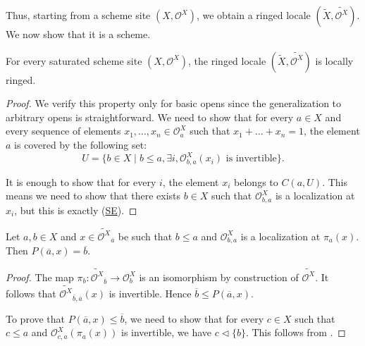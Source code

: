 \documentclass[reqno]{amsart}
\newcommand{\axref}[1]{(\hyperref[ax:#1]{#1})}
\theoremstyle{definition}
\theoremstyle{remark}
\numberwithin{figure}{section}
\newcommand{\cover}{\triangleleft}
\begin{document}
Thus, starting from a scheme site $(X,\mathcal{O}^X)$, we obtain a ringed locale $(\widetilde{X},\widetilde{\mathcal{O}^X})$.
We now show that it is a scheme.

\begin{lem}
For every saturated scheme site $(X,\mathcal{O}^X)$, the ringed locale $(\widetilde{X},\widetilde{\mathcal{O}^X})$ is locally ringed.
\end{lem}
\begin{proof}
We verify this property only for basic opens since the generalization to arbitrary opens is straightforward.
We need to show that for every $a \in X$ and every sequence of elements $x_1, \ldots, x_n \in \mathcal{O}^X_a$ such that $x_1 + \ldots + x_n = 1$, the element $a$ is covered by the following set:
\[ U = \{ b \in X \mid b \leq a, \exists i, \mathcal{O}^X_{b,a}(x_i) \text{ is invertible} \}. \]

It is enough to show that for every $i$, the element $x_i$ belongs to $C(a,U)$.
This means we need to show that there exists $b \in X$ such that $\mathcal{O}^X_{b,a}$ is a localization at $x_i$, but this is exactly \axref{SE}.
\end{proof}

\begin{lem}[po-char]
Let $a,b \in X$ and $x \in \widetilde{\mathcal{O}^X}_{\overline{a}}$ be such that $b \leq a$ and $\mathcal{O}^X_{b,a}$ is a localization at $\pi_a(x)$.
Then $P(\overline{a},x) = \overline{b}$.
\end{lem}
\begin{proof}
The map $\pi_b : \widetilde{\mathcal{O}^X}_{\overline{b}} \to \mathcal{O}^X_b$ is an isomorphism by construction of $\widetilde{\mathcal{O}^X}$.
It follows that $\widetilde{\mathcal{O}^X}_{\overline{b},\overline{a}}(x)$ is invertible.
Hence $\overline{b} \leq P(\overline{a},x)$.

To prove that $P(\overline{a},x) \leq \overline{b}$, we need to show that for every $c \in X$
such that $c \leq a$ and $\mathcal{O}^X_{c,a}(\pi_a(x))$ is invertible, we have $c \cover \{ b \}$.
This follows from .
\end{proof}
\end{document}

